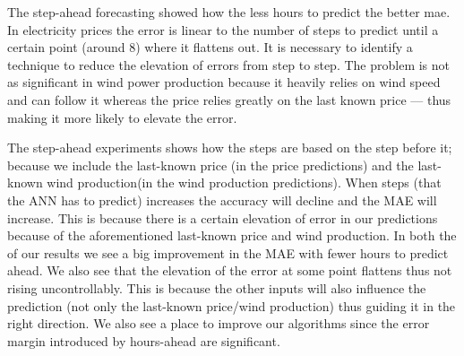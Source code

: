 The step-ahead forecasting showed how the less hours to predict the better mae. In electricity prices the error is linear to the number of steps to predict until a certain point (around 8) where it flattens out. It is necessary to identify a technique to reduce the elevation of errors from step to step. The problem is not as significant in wind power production because it heavily relies on wind speed and can follow it whereas the price relies greatly on the last known price --- thus making it more likely to elevate the error. 

The step-ahead experiments shows how the steps are based on the step before it; because we include the last-known price (in the price predictions) and the last-known wind production(in the wind production predictions). When steps (that the ANN has to predict) increases the accuracy will decline and the MAE will increase. This is because there is a certain elevation of error in our predictions because of the aforementioned last-known price and wind production. In both the of our results we see a big improvement in the MAE with fewer hours to predict ahead. We also see that the elevation of the error at some point flattens thus not rising uncontrollably. This is because the other inputs will also influence the prediction (not only the last-known price/wind production) thus guiding it in the right direction. We also see a place to improve our algorithms since the error margin introduced by hours-ahead are significant.
